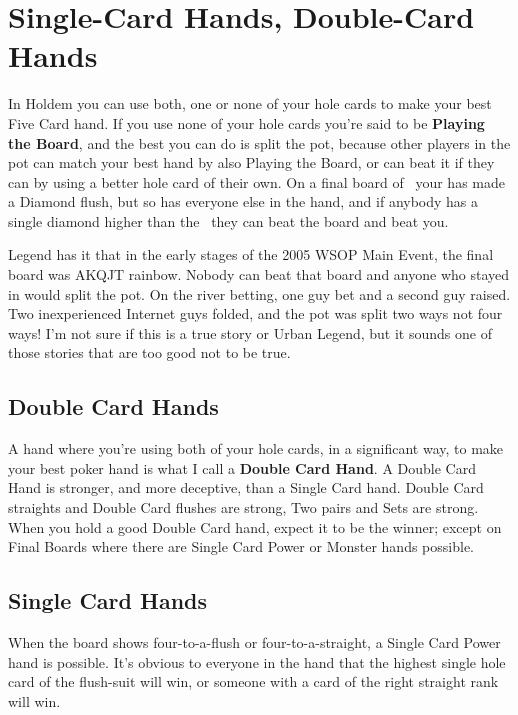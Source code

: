 \chapter{Single-Card Hands, Double-Card Hands}


In Holdem you can use both, one or none of your hole cards to make your
best Five Card hand. If you use none of your hole cards you're said to
be \textbf{Playing the Board}, and the best you can do is split the
pot, because other players in the pot can match your best hand by also
Playing the Board, or can beat it if they can by using a better hole
card of their own. On a final board of \Ad\nined\eigd\Jd\sixd\ your
\Qc\Qs has made a Diamond flush, but so has everyone else in the hand,
and if anybody has a single diamond higher than the \sixd\ they can
beat the board and beat you.

Legend has it that in the early stages of the 2005 WSOP Main Event,
the final board was AKQJT rainbow. Nobody can beat that board and
anyone who stayed in would split the pot. On the river betting, one
guy bet and a second guy raised. Two inexperienced Internet guys
folded, and the pot was split two ways not four ways! I'm not sure if
this is a true story or Urban Legend, but it sounds one of those
stories that are too good not to be true.

\section{Double Card Hands}

A hand where you're using both of your hole cards, in a significant
way, to make your best poker hand is what I call a \textbf{Double Card
Hand}. A Double Card Hand is stronger, and more deceptive, than a
Single Card hand. Double Card straights and Double Card flushes are
strong, Two pairs and Sets are strong. When you hold a good Double
Card hand, expect it to be the winner; except on Final Boards where
there are Single Card Power or Monster hands possible.

\section{Single Card Hands}

When the board shows four-to-a-flush or four-to-a-straight, a Single
Card Power hand is possible. It's obvious to everyone in the hand that
the highest single hole card of the flush-suit will win, or someone
with a card of the right straight rank will win.

